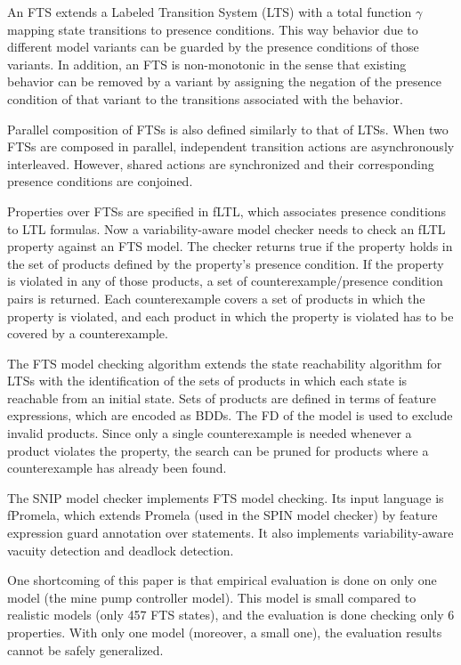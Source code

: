 \documentclass[11pt]{article}
\begin{document}
An FTS extends a Labeled Transition System (LTS) with a total function $\gamma$ mapping state transitions to presence conditions. This way behavior due to different model variants can be guarded by the presence conditions of those variants. In addition, an FTS is non-monotonic in the sense that existing behavior can be removed by a variant by assigning the negation of the presence condition of that variant to the transitions associated with the behavior.

Parallel composition of FTSs is also defined similarly to that of LTSs. When two FTSs are composed in parallel, independent transition actions are asynchronously interleaved. However, shared actions are synchronized and their corresponding presence conditions are conjoined. 

Properties over FTSs are specified in fLTL, which associates presence conditions to LTL formulas. Now a variability-aware model checker needs to check an fLTL property against an FTS model. The checker returns true if the property holds in the set of products defined by the property's presence condition. If the property is violated in any of those products, a set of counterexample/presence condition pairs is returned. Each counterexample covers a set of products in which the property is violated, and each product in which the property is violated  has to be covered by a counterexample.

The FTS model checking algorithm extends the state reachability algorithm for LTSs with the identification of the sets of products in which each state is reachable from an initial state. Sets of products are defined in terms of feature expressions, which are encoded as BDDs. The FD of the model is used to exclude invalid products. Since only a single counterexample is needed whenever a product violates the property, the search can be pruned for products where a counterexample has already been found.

The SNIP model checker implements FTS model checking. Its input language is fPromela, which extends Promela (used in the SPIN model checker) by feature expression guard annotation over statements. It also implements variability-aware vacuity detection and deadlock detection.

One shortcoming of this paper is that empirical evaluation is done on only one model (the mine pump controller model). This model is small compared to realistic models (only 457 FTS states), and the evaluation is done checking only 6 properties. With only one model (moreover, a small one), the evaluation results cannot be safely generalized. 
\end{document}
